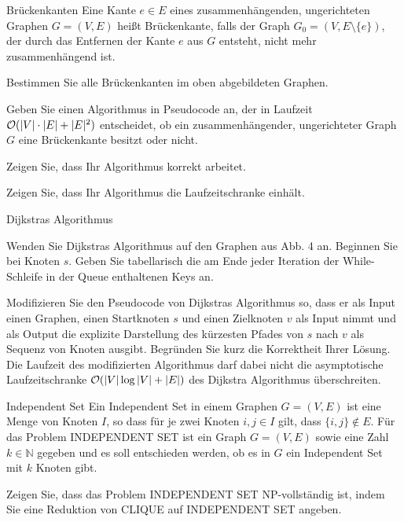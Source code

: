\documentclass{exercisesheet}
\begin{document}
\begin{eexercises}{Brückenkanten}{
    Eine Kante $e \in E$ eines zusammenhängenden, ungerichteten Graphen $G = (V, E)$ heißt Brückenkante, falls der Graph $G_0 = (V, E \setminus \{e\})$, der durch das Entfernen der Kante $e$ aus $G$ entsteht, nicht mehr zusammenhängend ist.
  }
  \item Bestimmen Sie alle Brückenkanten im oben abgebildeten Graphen.
  \item Geben Sie einen Algorithmus in Pseudocode an, der in Laufzeit $\mathcal{O}(|V| \cdot |E| + |E|^2)$ entscheidet, ob ein zusammenhängender, ungerichteter Graph $G$ eine Brückenkante besitzt oder nicht.
  \item Zeigen Sie, dass Ihr Algorithmus korrekt arbeitet.
  \item Zeigen Sie, dass Ihr Algorithmus die Laufzeitschranke einhält.
\end{eexercises}

\begin{eexercises}{Dijkstras Algorithmus}{
  }
  \item Wenden Sie Dijkstras Algorithmus auf den Graphen aus Abb. 4 an. Beginnen Sie bei Knoten $s$. Geben Sie tabellarisch die am Ende jeder Iteration der While-Schleife in der Queue enthaltenen Keys an.
  \item Modifizieren Sie den Pseudocode von Dijkstras Algorithmus so, dass er als Input einen Graphen, einen Startknoten $s$ und einen Zielknoten $v$ als Input nimmt und als Output die explizite Darstellung des kürzesten Pfades von $s$ nach $v$ als Sequenz von Knoten ausgibt. Begründen Sie kurz die Korrektheit Ihrer Lösung. Die Laufzeit des modifizierten Algorithmus darf dabei nicht die asymptotische Laufzeitschranke $\mathcal{O}(|V| \log |V| + |E|)$ des Dijkstra Algorithmus überschreiten.
\end{eexercises}



\begin{exercise}{Independent Set}
  Ein Independent Set in einem Graphen $G = (V, E)$ ist eine Menge von Knoten $I$, so dass für je zwei Knoten $i, j \in I$ gilt, dass $\{i, j\} \notin E$. Für das Problem INDEPENDENT SET ist ein Graph $G = (V, E)$ sowie eine Zahl $k \in \mathbb{N}$ gegeben und es soll entschieden werden, ob es in $G$ ein Independent Set mit $k$ Knoten gibt.\par
  Zeigen Sie, dass das Problem INDEPENDENT SET NP-vollständig ist, indem Sie eine Reduktion von CLIQUE auf INDEPENDENT SET angeben.
\end{exercise}
\end{document}

